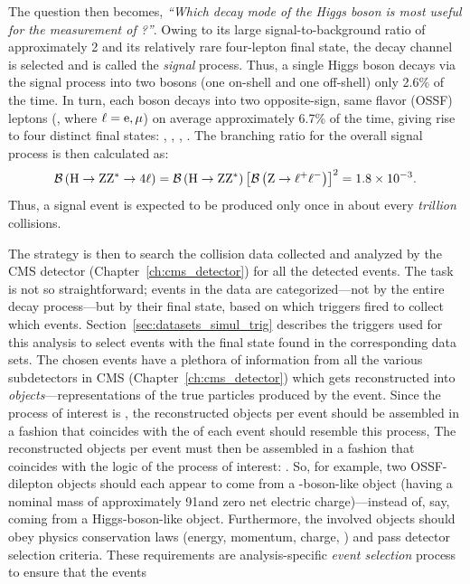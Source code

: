The question then becomes, \emph{``Which decay mode of the Higgs boson is most useful for the measurement of \mH?''}.
Owing to its large signal-to-background ratio of approximately 2 and its relatively rare four-lepton final state, the \hzzfourl decay channel is selected and is called the \emph{signal} process.
Thus, a single Higgs boson decays via the signal process into two \PZ bosons (one on-shell and one off-shell) only 2.6\% of the time.
In turn, each \PZ boson decays into two opposite-sign, same flavor (OSSF) leptons (\Ztolplm, where $\ell = \mathrm{e}, \mu$) on average approximately 6.7\% of the time, giving rise to four distinct final states:
\foure, \fourmu, \twoetwomu, \twomutwoe.
The branching ratio for the overall signal process is then calculated as: %
\begin{equation*}
    \BRof{\hzzfourl} = \BRof{\htozz} \left[ \BRof{\Ztolplm} \right]^2 = 1.8\tentotheminus{3}.
\end{equation*}
Thus, a signal event is expected to be produced only once in about every \emph{trillion} \pp collisions.

The strategy is then to search the \pp collision data collected and analyzed by the CMS detector (Chapter~\ref{ch:cms_detector}) for all the detected \hzzfourl events.
The task is not so straightforward;
events in the data are categorized---not by the entire decay process---but by their final state, based on which triggers fired to collect which events.
Section~\ref{sec:datasets_simul_trig} describes the triggers used for this analysis to select events with the \fourl final state found in the corresponding data sets.
The chosen events have a plethora of information from all the various subdetectors in CMS (Chapter~\ref{ch:cms_detector}) which gets reconstructed into \emph{objects}---representations of the true particles produced by the event.
Since the process of interest is \hzzfourl, the reconstructed objects per event should be assembled in a fashion that coincides with the  of each event should resemble this process, 
The reconstructed objects per event must then be assembled in a fashion that coincides with the logic of the process of interest: \hzzfourl.
So, for example, two OSSF-dilepton objects should each appear to come from a \PZ-boson-like object (\eg having a nominal mass of approximately 91\GeV and zero net electric charge)---instead of, say, coming from a Higgs-boson-like object.
Furthermore, the involved objects should obey physics conservation laws (energy, momentum, charge, \etc) and pass detector selection criteria.
These requirements are analysis-specific \emph{event selection} process to ensure that the events 

